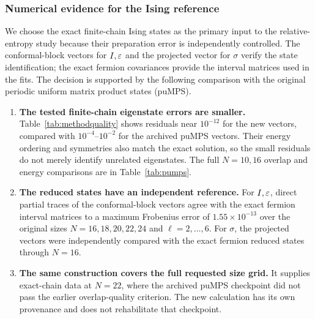 \subsubsection{Numerical evidence for the Ising reference}
\label{sec:method-quality-checks}
We choose the exact finite-chain Ising states as the primary input to the
relative-entropy study because their preparation error is independently
controlled. The conformal-block vectors for $I,\varepsilon$ and the projected
vector for $\sigma$ verify the state identification; the exact fermion
covariances provide the interval matrices used in the fits.
The decision is supported by the following comparison with the original
periodic uniform matrix product states (puMPS).

\begin{table}[htbp]\centering\small

\caption{Accuracy comparison at $N=16$ against the archived puMPS
checkpoint of bond dimension $D_{\rm bond}=14$, optimization seed $1250$.
All vectors are normalized and use Eq.~\eqref{eq:Hising} with both
couplings equal to one and periodic spin boundaries.
The residual $\eta$ is defined by Eq.~\eqref{eq:eigenresidual};
$1-F=1-|\langle\psi_{\rm new}|\psi_{\rm puMPS}\rangle|^2$ is the
infidelity. The new $\sigma$ vector uses block-seeded Lanczos, with
requested solver tolerance $2\times10^{-12}$, rather than a pure
conformal-block formula. Entries are from the original whole-vector
validation CSVs; no puMPS reoptimization is performed.}
\label{tab:methodquality}
\end{table}

\begin{enumerate}
\item \textbf{The tested finite-chain eigenstate errors are smaller.}
Table~\ref{tab:methodquality} shows residuals near $10^{-12}$ for the
new vectors, compared with $10^{-4}$--$10^{-2}$ for the archived puMPS
vectors. Their energy ordering and symmetries also match the exact
solution, so the small residuals do not merely identify unrelated
eigenstates. The full $N=10,16$ overlap and energy comparisons are in
Table~\ref{tab:pumps}.
\item \textbf{The reduced states have an independent reference.}
For $I,\varepsilon$, direct partial traces of the conformal-block vectors agree
with the exact fermion interval matrices to a maximum Frobenius error
of $1.55\times10^{-13}$ over the original sizes
$N=16,18,20,22,24$ and $\ell=2,\ldots,6$.
For $\sigma$, the projected vectors were independently compared with
the exact fermion reduced states through $N=16$.
\item \textbf{The same construction covers the full requested size grid.}
It supplies exact-chain data at $N=22$, where the archived puMPS
checkpoint did not pass the earlier overlap-quality criterion.
The new calculation has its own provenance and does not rehabilitate
that checkpoint.
\end{enumerate}


